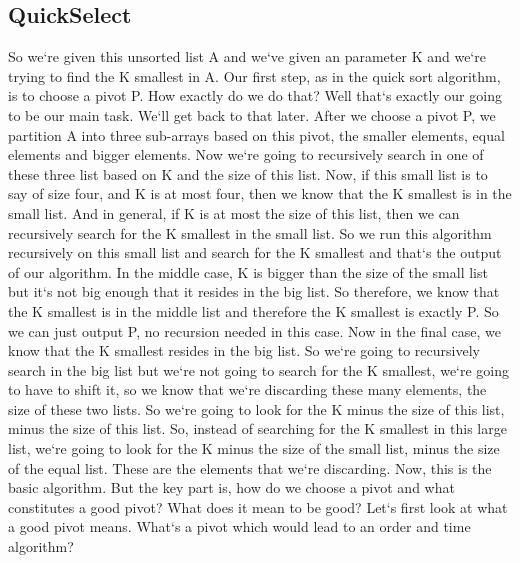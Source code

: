 \subsection{QuickSelect}
So we`re given this unsorted list A and we`ve given an parameter K and we`re trying to find the K smallest in A\@.
Our first step, as in the quick sort algorithm, is to choose a pivot P\@.
How exactly do we do that? Well that`s exactly our going to be our main task.
We`ll get back to that later.
After we choose a pivot P, we partition A into three sub-arrays based on this pivot, the smaller elements, equal elements and bigger elements.
Now we`re going to recursively search in one of these three list based on K and the size of this list.
Now, if this small list is to say of size four, and K is at most four, then we know that the K smallest is in the small list.
And in general, if K is at most the size of this list, then we can recursively search for the K smallest in the small list.
So we run this algorithm recursively on this small list and search for the K smallest and that`s the output of our algorithm.
In the middle case, K is bigger than the size of the small list but it`s not big enough that it resides in the big list.
So therefore, we know that the K smallest is in the middle list and therefore the K smallest is exactly P\@.
So we can just output P, no recursion needed in this case.
Now in the final case, we know that the K smallest resides in the big list.
So we`re going to recursively search in the big list but we`re not going to search for the K smallest, we`re going to have to shift it, so we know that we`re discarding these many elements, the size of these two lists.
So we`re going to look for the K minus the size of this list, minus the size of this list.
So, instead of searching for the K smallest in this large list, we`re going to look for the K minus the size of the small list, minus the size of the equal list.
These are the elements that we`re discarding.
Now, this is the basic algorithm.
But the key part is, how do we choose a pivot and what constitutes a good pivot? What does it mean to be good? Let`s first look at what a good pivot means.
What`s a pivot which would lead to an order and time algorithm?

